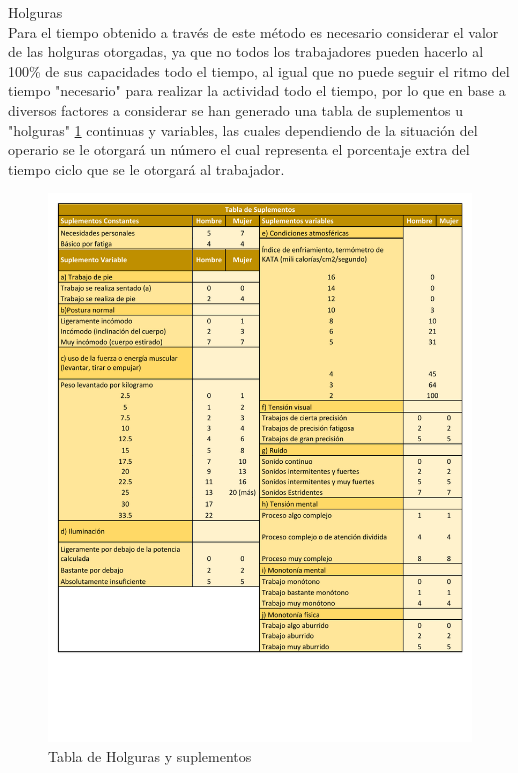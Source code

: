     Holguras\\
    Para el tiempo obtenido a través de este método es necesario considerar el valor de las holguras otorgadas, ya que no todos los trabajadores pueden hacerlo al 100\% de sus capacidades todo el tiempo, al igual que no puede seguir el ritmo del tiempo "necesario" para realizar la actividad todo el tiempo, por lo que en base a diversos factores a considerar se han generado una tabla de suplementos u "holguras" \ref{fig:tablaHolguras} continuas y variables, las cuales dependiendo de la situación del operario se le otorgará un número el cual representa el porcentaje extra del tiempo ciclo que se le otorgará al trabajador.
    \begin{figure}[H]
        \centering
        \includegraphics[trim = {1mm 40mm 1mm 1mm},clip,scale=0.4]{19/Img/tablaHolguras.pdf}
        \caption{Tabla de Holguras y suplementos}
        \label{fig:tablaHolguras}
    \end{figure}
